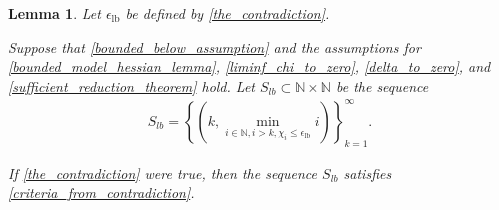 \documentclass{article}
\newtheorem{lemma}[theorem]{Lemma}
\theoremstyle{case}
\numberwithin{theorem}{subsection}
\newcommand{\naturals}{\mathbb N}
\begin{document}
\begin{lemma}
\label{contradiction_portion}
Let $ \epsilon_{\textrm{lb}} $ be defined by \cref{the_contradiction}.

Suppose that 
\cref{bounded_below_assumption}
and the assumptions for
\cref{bounded_model_hessian_lemma}, \cref{liminf_chi_to_zero}, \cref{delta_to_zero}, and \cref{sufficient_reduction_theorem} hold.
Let 
$S_{lb} \subset \naturals \times \naturals$ be the sequence
\begin{align}
\label{define_slb}
S_{lb} = \left\{\left(k,
\min_{i \in \naturals, i > k, \chi_{i} \le \epsilon_{\textrm{lb}}} i
\right)\right\}_{k=1}^{\infty}.
\end{align}

If \cref{the_contradiction} were true, then the sequence $S_{lb}$ satisfies \cref{criteria_from_contradiction}.
\end{lemma}
\end{document}
